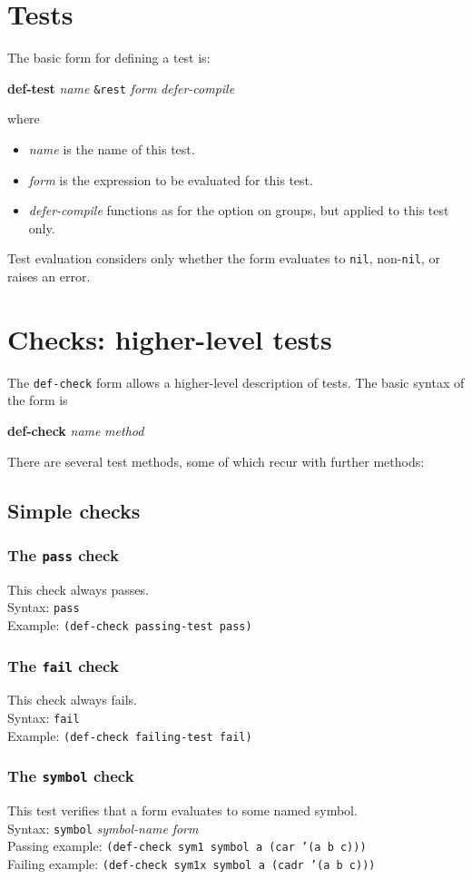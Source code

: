 \documentclass{article}
\begin{document}
\section{Tests}
The basic form for defining a test is:
\begin{center}
\textbf{def-test} \textit{name}
 \texttt{\&rest} \textit{form} \textit{defer-compile}
\end{center}
where
\begin{itemize}
\item\textit{name} is the name of this test.
\item\textit{form} is the expression to be evaluated for this test.
\item\textit{defer-compile} functions as for the option on groups, but
  applied to this test only.
\end{itemize}
Test evaluation considers only whether the form evaluates to
\texttt{nil}, non-\texttt{nil}, or raises an error.
\section{Checks: higher-level tests}
The \texttt{def-check} form allows a higher-level description of
tests.  The basic syntax of the form is
\begin{center}
\textbf{def-check} \textit{name} \textit{method}
\end{center}
There are several test methods, some of which recur with further
methods:
\subsection{Simple checks}
\subsubsection{The \texttt{pass} check} 
This check always passes.
\\ Syntax: \texttt{pass}
\\ Example: \texttt{(def-check passing-test pass)}

\subsubsection{The \texttt{fail} check} 
This check always fails.
\\ Syntax: \texttt{fail}
\\ Example: \texttt{(def-check failing-test fail)}

\subsubsection{The \texttt{symbol} check} 
This test verifies that a form evaluates to some named symbol.
\\ Syntax: \texttt{symbol} \textit{symbol-name} \textit{form}
\\ Passing example: \texttt{(def-check sym1 symbol a (car '(a b c)))}
\\ Failing example: \texttt{(def-check sym1x symbol a (cadr '(a b c)))}
\end{document}
